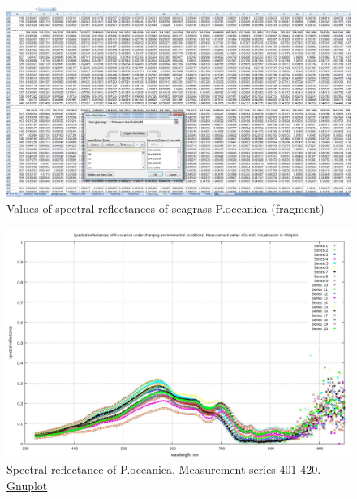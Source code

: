 \documentclass[10pt, a4paper]{article}
\begin{document}
\begin{appendices}
\appendix \label{app}
\appendixpage
\addappheadtotoc
{}

\begin{figure}[h]
	\begin{center}
		\includegraphics[scale=0.20]{App-1.jpg}
		\caption{Values of spectral reflectances of seagrass P.oceanica (fragment)}
		\label{fig:42}
	\end{center}
\end{figure}
\begin{figure}[h]
	\begin{center}
		\includegraphics[scale=0.20]{GNU-401-420.jpg}
		\caption{Spectral reflectance of P.oceanica. Measurement series 401-420. \href{http://www.gnuplot.info/}{Gnuplot}}
		\label{fig:43}
	\end{center}
\end{figure}

\end{appendices}
\end{document}
